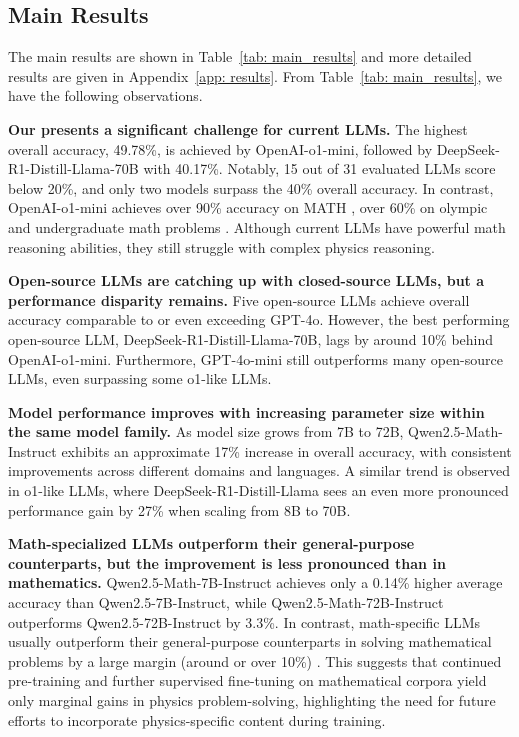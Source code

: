 \subsection{Main Results}

The main results are shown in Table~\ref{tab: main_results} and more detailed results are given in Appendix~\ref{app: results}.
From Table~\ref{tab: main_results}, we have the following observations.

\textbf{Our {\benchmark} presents a significant challenge for current LLMs.}
The highest overall accuracy, 49.78\%, is achieved by OpenAI-o1-mini, followed by DeepSeek-R1-Distill-Llama-70B with 40.17\%. 
Notably, 15 out of 31 evaluated LLMs score below 20\%, and only two models surpass the 40\% overall accuracy. 
In contrast, OpenAI-o1-mini achieves over 90\% accuracy on MATH \citep{MATH2021hendrycks}, over 60\% on olympic and undergraduate math problems \citep{omnimath2024gao, ugmathbench2025xu}.
Although current LLMs have powerful math reasoning abilities, they still struggle with complex physics reasoning.

\textbf{Open-source LLMs are catching up with closed-source LLMs, but a performance disparity remains.}
Five open-source LLMs achieve overall accuracy comparable to or even exceeding GPT-4o.
However, the best performing open-source LLM, DeepSeek-R1-Distill-Llama-70B, lags by around 10\%  behind OpenAI-o1-mini.
Furthermore, GPT-4o-mini still outperforms many open-source LLMs, even surpassing some o1-like LLMs.


\textbf{Model performance improves with increasing parameter size within the same model family.}
As model size grows from 7B to 72B, Qwen2.5-Math-Instruct exhibits an approximate 17\% increase in overall accuracy, with consistent improvements across different domains and languages. 
A similar trend is observed in o1-like LLMs, where DeepSeek-R1-Distill-Llama sees an even more pronounced performance gain by 27\% when scaling from 8B to 70B.


\textbf{Math-specialized LLMs outperform their general-purpose counterparts, but the improvement is less pronounced than in mathematics.}
Qwen2.5-Math-7B-Instruct achieves only a 0.14\% higher average accuracy than Qwen2.5-7B-Instruct, while Qwen2.5-Math-72B-Instruct outperforms Qwen2.5-72B-Instruct by 3.3\%. 
In contrast, math-specific LLMs usually outperform their general-purpose counterparts in solving mathematical problems by a large margin (around or over 10\%) \citep{MathBench2024Liu, ugmathbench2025xu}.
This suggests that continued pre-training and further supervised fine-tuning on mathematical corpora yield only marginal gains in physics problem-solving, highlighting the need for future efforts to incorporate physics-specific content during training.

